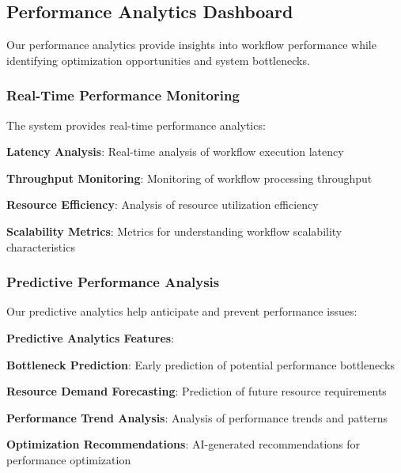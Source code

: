 \subsection*{Performance Analytics Dashboard}

Our performance analytics provide insights into workflow performance while identifying optimization opportunities and system bottlenecks.

\subsubsection*{Real-Time Performance Monitoring}

The system provides real-time performance analytics:

\begin{compactlist}
    \item \textbf{Latency Analysis}: Real-time analysis of workflow execution latency
    \item \textbf{Throughput Monitoring}: Monitoring of workflow processing throughput
    \item \textbf{Resource Efficiency}: Analysis of resource utilization efficiency
    \item \textbf{Scalability Metrics}: Metrics for understanding workflow scalability characteristics
\end{compactlist}

\subsubsection*{Predictive Performance Analysis}

Our predictive analytics help anticipate and prevent performance issues:

\begin{alertbox}
\textbf{Predictive Analytics Features}:
\begin{compactlist}
    \item \textbf{Bottleneck Prediction}: Early prediction of potential performance bottlenecks
    \item \textbf{Resource Demand Forecasting}: Prediction of future resource requirements
    \item \textbf{Performance Trend Analysis}: Analysis of performance trends and patterns
    \item \textbf{Optimization Recommendations}: AI-generated recommendations for performance optimization
\end{compactlist}
\end{alertbox}

